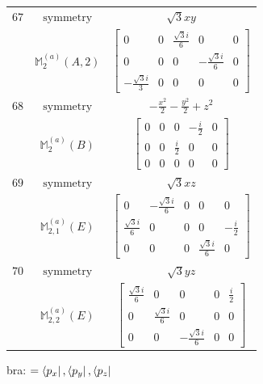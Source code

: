 \documentclass[fleqn,8pt,landscape]{jsarticle}
\begin{document}
\begin{longtable}{ccc}
$ 67 $ & $ \text{symmetry} $ & $ \sqrt{3} x y $ \\
$  $ & $ \mathbb{M}_{2}^{(a)}(A,2) $ & $ \begin{bmatrix} 0 & 0 & \frac{\sqrt{3} i}{6} & 0 & 0 \\ 0 & 0 & 0 & - \frac{\sqrt{3} i}{6} & 0 \\ - \frac{\sqrt{3} i}{3} & 0 & 0 & 0 & 0 \end{bmatrix} $ \\ \hline
$ 68 $ & $ \text{symmetry} $ & $ - \frac{x^{2}}{2} - \frac{y^{2}}{2} + z^{2} $ \\
$  $ & $ \mathbb{M}_{2}^{(a)}(B) $ & $ \begin{bmatrix} 0 & 0 & 0 & - \frac{i}{2} & 0 \\ 0 & 0 & \frac{i}{2} & 0 & 0 \\ 0 & 0 & 0 & 0 & 0 \end{bmatrix} $ \\ \hline
$ 69 $ & $ \text{symmetry} $ & $ \sqrt{3} x z $ \\
$  $ & $ \mathbb{M}_{2,1}^{(a)}(E) $ & $ \begin{bmatrix} 0 & - \frac{\sqrt{3} i}{6} & 0 & 0 & 0 \\ \frac{\sqrt{3} i}{6} & 0 & 0 & 0 & - \frac{i}{2} \\ 0 & 0 & 0 & \frac{\sqrt{3} i}{6} & 0 \end{bmatrix} $ \\ \hline
$ 70 $ & $ \text{symmetry} $ & $ \sqrt{3} y z $ \\
$  $ & $ \mathbb{M}_{2,2}^{(a)}(E) $ & $ \begin{bmatrix} \frac{\sqrt{3} i}{6} & 0 & 0 & 0 & \frac{i}{2} \\ 0 & \frac{\sqrt{3} i}{6} & 0 & 0 & 0 \\ 0 & 0 & - \frac{\sqrt{3} i}{6} & 0 & 0 \end{bmatrix} $ \\ \hline
\end{longtable}
bra: $=\bra{p_{x}}, \bra{p_{y}}, \bra{p_{z}}$
\end{document}
